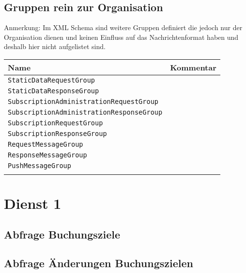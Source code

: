 \subsection*{Gruppen rein zur Organisation}
Anmerkung: Im XML Schema sind weitere Gruppen definiert die jedoch nur der Organisation dienen und keinen Einfluss auf das Nachrichtenformat haben und deshalb hier nicht aufgelistet sind.
\begin{samepage}
\begin{flushleft}
\begin{tabularx}{\linewidth}{l>{\raggedright\arraybackslash}X} 
\toprule
Name &  Kommentar\\
\midrule 
\texttt{StaticDataRequestGroup} & \\
\texttt{StaticDataResponseGroup}& \\
\texttt{SubscriptionAdministrationRequestGroup} & \\
\texttt{SubscriptionAdministrationResponseGroup}& \\
\texttt{SubscriptionRequestGroup} & \\
\texttt{SubscriptionResponseGroup}& \\
\texttt{RequestMessageGroup}& \\
\texttt{ResponseMessageGroup}& \\
\texttt{PushMessageGroup}& \\
\bottomrule 
\label{tab:miscGroups}
\end{tabularx}\end{flushleft}\end{samepage}

\section{Dienst 1}
\label{sec:Nachrichten:Dienst1}

\subsection*{Abfrage Buchungsziele}
\label{subsec:Nachrichten:Dienst1:BookingTargets}





\subsection*{Abfrage Änderungen Buchungszielen}
\label{subsec:Nachrichten:Dienst1:ChangeProviders}





